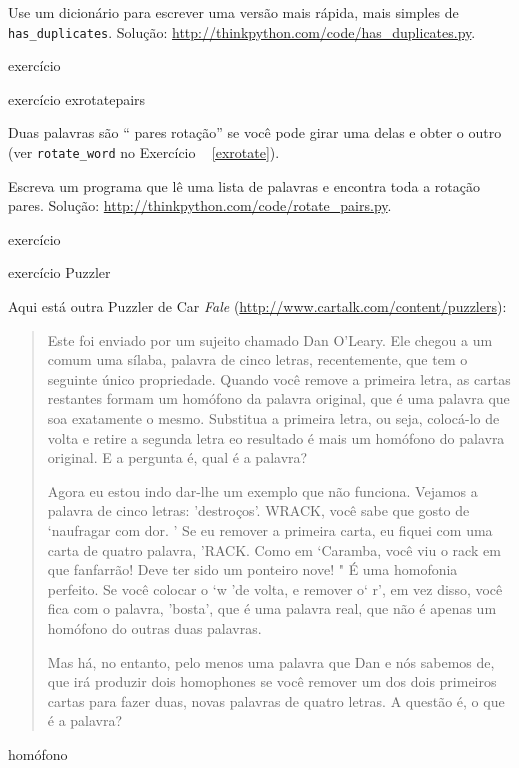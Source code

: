 \documentclass[10pt]{book}
\begin{document}
\begin{v erbatim}
\begin{}
Use um dicionário para escrever uma versão mais rápida, mais simples de
\verb "has_duplicates". 
Solução: \url{http://thinkpython.com/code/has_duplicates.py}.

\end{} exercício


\begin{} exercício
\label{} exrotatepairs

Duas palavras são `` pares rotação'' se você pode girar uma delas
e obter o outro (ver \verb "rotate_word" no Exercício ~ \ref {exrotate}).

Escreva um programa que lê uma lista de palavras e encontra toda a rotação
pares. Solução: \url{http://thinkpython.com/code/rotate_pairs.py}.

\end{} exercício


\begin{} exercício
\index{} Puzzler

Aqui está outra Puzzler de {Car \em
Fale} (\url{http://www.cartalk.com/content/puzzlers}):

\begin{quote}
Este foi enviado por um sujeito chamado Dan O'Leary. Ele chegou a um comum
uma sílaba, palavra de cinco letras, recentemente, que tem o seguinte único
propriedade. Quando você remove a primeira letra, as cartas restantes formam
um homófono da palavra original, que é uma palavra que soa exatamente
o mesmo. Substitua a primeira letra, ou seja, colocá-lo de volta e retire
a segunda letra eo resultado é mais um homófono do
palavra original. E a pergunta é, qual é a palavra?

Agora eu estou indo dar-lhe um exemplo que não funciona. Vejamos
a palavra de cinco letras: 'destroços'. WRACK, você sabe que gosto de `naufragar com
dor. ' Se eu remover a primeira carta, eu fiquei com uma carta de quatro
palavra, 'RACK. Como em `Caramba, você viu o rack em que fanfarrão!
Deve ter sido um ponteiro nove! " É uma homofonia perfeito. Se você
colocar o `w 'de volta, e remover o` r', em vez disso, você fica com o
palavra, 'bosta', que é uma palavra real, que não é apenas um homófono do
outras duas palavras.

Mas há, no entanto, pelo menos uma palavra que Dan e nós sabemos de,
que irá produzir dois homophones se você remover um dos dois primeiros
cartas para fazer duas, novas palavras de quatro letras. A questão é, o que é
a palavra?
\end{quote}
\index{} homófono


\end{}
\end{v erbatim}
\end{document}
